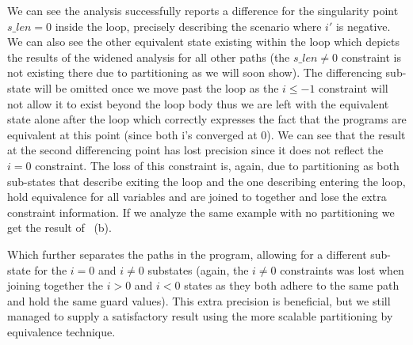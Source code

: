 We can see the analysis successfully reports a difference for the singularity point $s\_len = 0$ inside the loop, precisely describing the scenario where $i'$ is negative. We can also see the other equivalent state existing within the loop which depicts the results of the widened analysis for all other paths (the $s\_len \neq 0$ constraint is not existing there due to partitioning as we will soon show). The differencing sub-state will be omitted once we move past the loop as the $i \leq -1$ constraint will not allow it to exist beyond the loop body  thus we are left with the equivalent state alone after the loop which correctly expresses the fact that the programs are equivalent at this point (since both i's converged at 0). We can see that the result at the second differencing point has lost precision since it does not reflect the $i = 0$ constraint. The loss of this constraint is, again, due to partitioning as both sub-states that describe exiting the loop and the one describing entering the loop, hold equivalence for all variables and are joined to together and lose the extra constraint information.
If we analyze the same example with no partitioning we get the result of ~(b).

Which further separates the paths in the program, allowing for a different sub-state for the $i = 0$ and $i \neq 0$ substates (again, the $i \neq 0$ constraints was lost when joining together the $i > 0$ and $i < 0$ states as they both adhere to the same path and hold the same guard values). This extra precision is beneficial, but we still managed to supply a satisfactory result using the more scalable partitioning by equivalence technique.

%


